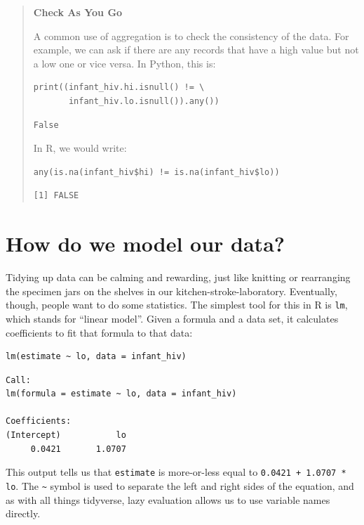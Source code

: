 \begin{quote}
\textbf{Check As You Go}

A common use of aggregation is to check the consistency of the data.
For example,
we can ask if there are any records that have a high value but not a low one or vice versa.
In Python, this is:

\begin{lstlisting}
print((infant_hiv.hi.isnull() != \
       infant_hiv.lo.isnull()).any())
\end{lstlisting}

\begin{lstlisting}
False
\end{lstlisting}

\noindent
In R, we would write:

\begin{lstlisting}
any(is.na(infant_hiv$hi) != is.na(infant_hiv$lo))
\end{lstlisting}

\begin{lstlisting}
[1] FALSE
\end{lstlisting}
\end{quote}

\section{How do we model our data?}

Tidying up data can be calming and rewarding,
just like knitting or rearranging the specimen jars on the shelves in our kitchen-stroke-laboratory.
Eventually,
though,
people want to do some statistics.
The simplest tool for this in R is \texttt{lm}, which stands for ``linear model''.
Given a formula and a data set,
it calculates coefficients to fit that formula to that data:

\begin{lstlisting}
lm(estimate ~ lo, data = infant_hiv)
\end{lstlisting}

\begin{lstlisting}
Call:
lm(formula = estimate ~ lo, data = infant_hiv)

Coefficients:
(Intercept)           lo  
     0.0421       1.0707  
\end{lstlisting}

\noindent
This output tells us that \texttt{estimate} is more-or-less equal to \texttt{0.0421 + 1.0707 * lo}.
The \texttt{{\textasciitilde}} symbol is used to separate the left and right sides of the equation,
and as with all things tidyverse,
lazy evaluation allows us to use variable names directly.

